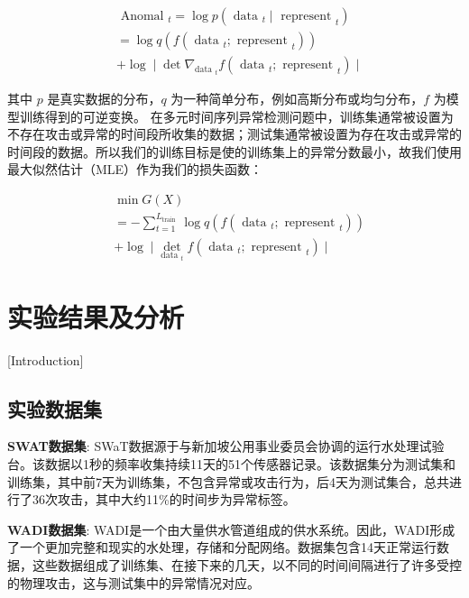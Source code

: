   \begin{equation}
    \begin{aligned}
    &\text { Anomal }_t=\log p\left(\text { data }_t \mid \text { represent }_t\right) \\
    &=\log q\left(f\left(\text { data }_t ; \text { represent }_t\right)\right) \\
    &+\log \mid \operatorname{det} \nabla_{\text {data }_t} f\left(\text { data }_t ; \text { represent }_t\right) \mid
    \end{aligned}
    \end{equation}
  
  其中 $p$ 是真实数据的分布，$q$ 为一种简单分布，例如高斯分布或均匀分布，$f$ 为模型训练得到的可逆变换。
  在多元时间序列异常检测问题中，训练集通常被设置为不存在攻击或异常的时间段所收集的数据；测试集通常被设置为存在攻击或异常的时间段的数据。所以我们的训练目标是使的训练集上的异常分数最小，故我们使用最大似然估计（MLE）作为我们的损失函数：
  
  \begin{equation}
    \begin{aligned}
    &\min G(X) \\
    &=-\sum_{t=1}^{L_{\text {train }}} \log q\left(f\left(\text { data }_t ; \text { represent }_t\right)\right) \\
    &+\log \mid \operatorname{det}_{\text {data }_t} f\left(\text { data }_t ; \text { represent }_t\right) \mid
    \end{aligned}
    \end{equation}

\section{实验结果及分析}[Introduction]
\subsection{实验数据集}
\textbf{SWAT数据集}\cite{swat}: SWaT数据源于与新加坡公用事业委员会协调的运行水处理试验台。该数据以1秒的频率收集持续11天的51个传感器记录。该数据集分为测试集和训练集，其中前7天为训练集，不包含异常或攻击行为，后4天为测试集合，总共进行了36次攻击，其中大约11\%的时间步为异常标签。

\textbf{WADI数据集}: WADI是一个由大量供水管道组成的供水系统。因此，WADI形成了一个更加完整和现实的水处理，存储和分配网络。数据集包含14天正常运行数据，这些数据组成了训练集、在接下来的几天，以不同的时间间隔进行了许多受控的物理攻击，这与测试集中的异常情况对应。

